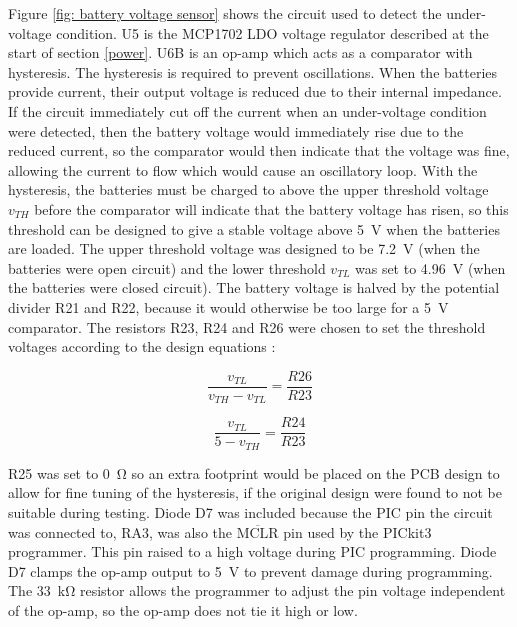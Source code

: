 Figure \ref{fig: battery voltage sensor} shows the circuit used to detect the under-voltage condition. U5 is the MCP1702 LDO voltage regulator described at the start of section \ref{power}. U6B is an op-amp which acts as a comparator with hysteresis. The hysteresis is required to prevent oscillations. When the batteries provide current, their output voltage is reduced due to their internal impedance. If the circuit immediately cut off the current when an under-voltage condition were detected, then the battery voltage would immediately rise due to the reduced current, so the comparator would then indicate that the voltage was fine, allowing the current to flow which would cause an oscillatory loop. With the hysteresis, the batteries must be charged to above the upper threshold voltage $v_{TH}$ before the comparator will indicate that the battery voltage has risen, so this threshold can be designed to give a stable voltage above \SI{5}{\volt} when the batteries are loaded. The upper threshold voltage was designed to be \SI{7.2}{\volt} (when the batteries were open circuit) and the lower threshold $v_{TL}$ was set to \SI{4.96}{\volt} (when the batteries were closed circuit). The battery voltage is halved by the potential divider R21 and R22, because it would otherwise be too large for a \SI{5}{\volt} comparator. The resistors R23, R24 and R26 were chosen to set the threshold voltages according to the design equations \cite{hysteresis}:

\begin{multicols}{2}
\begin{equation}
\frac{v_{TL}}{v_{TH} - v_{TL}} = \frac{R26}{R23}
\end{equation}

\begin{equation}
\frac{v_{TL}}{5 - v_{TH}} = \frac{R24}{R23}
\end{equation}
\end{multicols}

R25 was set to \SI{0}{\ohm} so an extra footprint would be placed on the PCB design to allow for fine tuning of the hysteresis, if the original design were found to not be suitable during testing. Diode D7 was included because the PIC pin the circuit was connected to, RA3, was also the $\overline{\text{MCLR}}$ pin used by the PICkit3 programmer. This pin raised to a high voltage during PIC programming. Diode D7 clamps the op-amp output to \SI{5}{\volt} to prevent damage during programming. The \SI{33}{\kilo\ohm} resistor allows the programmer to adjust the pin voltage independent of the op-amp, so the op-amp does not tie it high or low.\\


